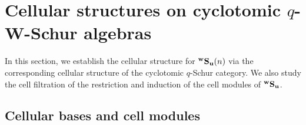 

\section{Cellular structures on cyclotomic $q$-W-Schur algebras}
\label{sec:cellular}

In this section, we establish the cellular structure for ${}^{\bold{w}}\bold{S}_{\mathbf{u}}(n)$ via the corresponding cellular structure of the cyclotomic $q$-Schur category. We also study the cell filtration of the restriction and induction of the cell modules of ${}^{\bold{w}}\bold{S}_{\mathbf{u}}$.

    
 \subsection{Cellular bases and cell modules}   

